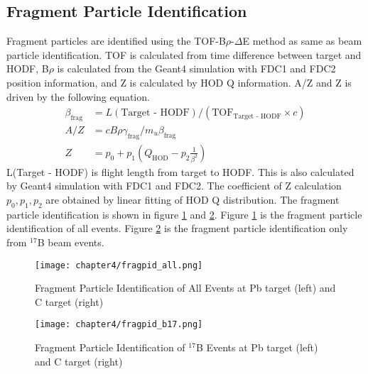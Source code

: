 \subsection{Fragment Particle Identification}
Fragment particles are identified using the TOF-B$\rho$-$\Delta$E method as same as beam particle identification. TOF is calculated from time difference between target and HODF, B$\rho$ is calculated from the Geant4 simulation with FDC1 and FDC2 position information, and Z is calculated by HOD Q information. A/Z and Z is driven by the following equation.
\begin{align}
    \beta_{\text{frag}} &= L(\text{Target - HODF}) / ( {\text{TOF}}_{\text{Target - HODF}} \times c )\\
    A/Z &= c B\rho \gamma_{\text{frag}} / m_u \beta_{\text{frag}}\\
    Z &= p_0 + p_1 (Q_{\text{HOD}} - p_2 \frac{1}{\beta^2})
\end{align}
L(Target - HODF) is flight length from target to HODF. This is also calculated by Geant4 simulation with FDC1 and FDC2. The coefficient of Z calculation $p_0, p_1, p_2$ are obtained by linear fitting of HOD Q distribution. The fragment particle identification is shown in figure \ref{fig:fragpid_all} and \ref{fig:fragpid_b17}. Figure \ref{fig:fragpid_all} is the fragment particle identification of all events. Figure \ref{fig:fragpid_b17} is the fragment particle identification only from ${}^{17}$B beam events.

\begin{figure}
    \centering
    \texttt{[image: chapter4/fragpid\_all.png]}
    \caption[Fragment Particle Identification from All Secondary Beam]{Fragment Particle Identification of All Events at Pb target (left) and C target (right)}
    \label{fig:fragpid_all}
\end{figure}

\begin{figure}
    \centering
    \texttt{[image: chapter4/fragpid\_b17.png]}
    \caption[Fragment Particle Identification from ${}^{17}$B Beam]{Fragment Particle Identification of ${}^{17}$B Events at Pb target (left) and C target (right)}
    \label{fig:fragpid_b17}
\end{figure}

\clearpage

